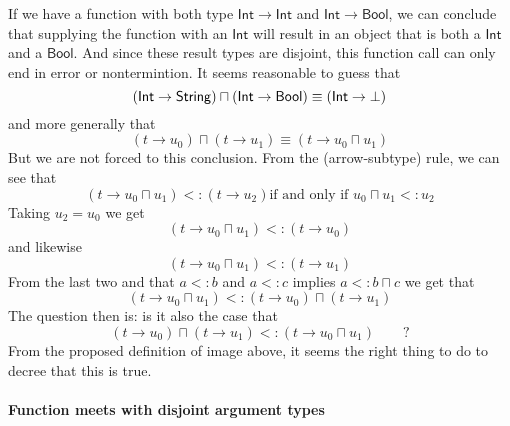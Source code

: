 \documentclass[12pt]{article}
\begin{document}
If we have a function with both type $\mathsf{Int}\rightarrow \mathsf{Int}$
and $\mathsf{Int}\rightarrow \mathsf{Bool}$, we can conclude that supplying
the function with an $\mathsf{Int}$ will result in an object that is both a $%
\mathsf{Int}$ and a $\mathsf{Bool}$. And since these result types are
disjoint, this function call can only end in error or nontermintion. It
seems reasonable to guess that%
\begin{equation*}
\left( \mathsf{Int}\rightarrow \mathsf{String}\right) \sqcap \left( \mathsf{%
Int}\rightarrow \mathsf{Bool}\right) \equiv \left( \mathsf{Int}\rightarrow
\bot \right)
\end{equation*}%
and more generally that 
\begin{equation*}
\left( t\rightarrow u_{0}\right) \sqcap \left( t\rightarrow u_{1}\right)
\equiv \left( t\rightarrow u_{0}\sqcap u_{1}\right)
\end{equation*}%
But we are not forced to this conclusion. From the (arrow-subtype) rule, we
can see that%
\begin{equation*}
\left. \left( t\rightarrow u_{0}\sqcap u_{1}\right) <:\left( t\rightarrow
u_{2}\right) \right. \text{if and only if }u_{0}\sqcap u_{1}<:u_{2}
\end{equation*}%
Taking $u_{2}=u_{0}$ we get%
\begin{equation*}
\left( t\rightarrow u_{0}\sqcap u_{1}\right) <:\left( t\rightarrow
u_{0}\right)
\end{equation*}%
and likewise%
\begin{equation*}
\left( t\rightarrow u_{0}\sqcap u_{1}\right) <:\left( t\rightarrow
u_{1}\right)
\end{equation*}%
From the last two and that $a<:b$ and $a<:c$ implies $a<:b\sqcap c$ we get
that%
\begin{equation*}
\left( t\rightarrow u_{0}\sqcap u_{1}\right) <:\left( t\rightarrow
u_{0}\right) \sqcap \left( t\rightarrow u_{1}\right)
\end{equation*}%
The question then is: is it also the case that 
\begin{equation*}
\left( t\rightarrow u_{0}\right) \sqcap \left( t\rightarrow u_{1}\right)
<:\left( t\rightarrow u_{0}\sqcap u_{1}\right) \qquad \text{?}
\end{equation*}%
From the proposed definition of image above, it seems the right thing to do
to decree that this is true.

\paragraph{Function meets with disjoint argument types}
\end{document}
